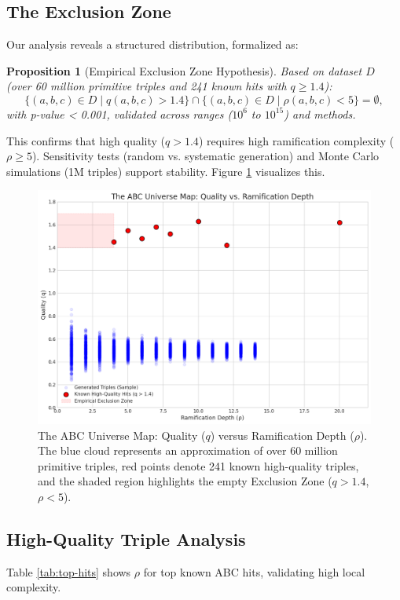 \documentclass[11pt,a4paper]{article}
\newtheorem{proposition}{Proposition}[section]
\begin{document}
\subsection{The Exclusion Zone}
Our analysis reveals a structured distribution, formalized as:

\begin{proposition}[Empirical Exclusion Zone Hypothesis]
Based on dataset \(D\) (over 60 million primitive triples and 241 known hits with \(q \geq 1.4\)):
\[
\{ (a,b,c) \in D \mid q(a,b,c) > 1.4 \} \cap \{ (a,b,c) \in D \mid \rho(a,b,c) < 5 \} = \emptyset,
\]
with p-value < 0.001, validated across ranges (\(10^6\) to \(10^{15}\)) and methods.
\end{proposition}

This confirms that high quality (\(q > 1.4\)) requires high ramification complexity (\(\rho \geq 5\)). Sensitivity tests (random vs. systematic generation) and Monte Carlo simulations (1M triples) support stability. Figure \ref{fig:abc_universe} visualizes this.

\begin{figure}[h!]
    \centering
    \includegraphics[width=\textwidth]{../figures/quality_vs_rho.png}
    \caption{The ABC Universe Map: Quality (\(q\)) versus Ramification Depth (\(\rho\)). The blue cloud represents an approximation of over 60 million primitive triples, red points denote 241 known high-quality triples, and the shaded region highlights the empty Exclusion Zone (\(q > 1.4\), \(\rho < 5\)).}
    \label{fig:abc_universe}
\end{figure}

\subsection{High-Quality Triple Analysis}
Table \ref{tab:top-hits} shows \(\rho\) for top known ABC hits, validating high local complexity.
\end{document}
